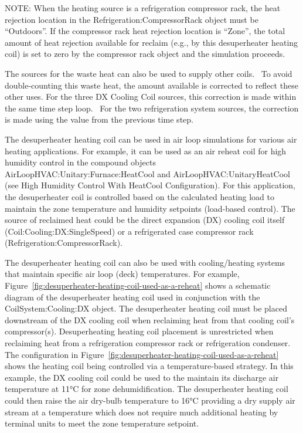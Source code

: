 NOTE: When the heating source is a refrigeration compressor rack, the heat rejection location in the Refrigeration:CompressorRack object must be ``Outdoors''. If the compressor rack heat rejection location is ``Zone'', the total amount of heat rejection available for reclaim (e.g., by this desuperheater heating coil) is set to zero by the compressor rack object and the simulation proceeds.

The sources for the waste heat can also be used to supply other coils.~ To avoid double-counting this waste heat, the amount available is corrected to reflect these other uses. For the three DX Cooling Coil sources, this correction is made within the same time step loop.~ For the two refrigeration system sources, the correction is made using the value from the previous time step.

The desuperheater heating coil can be used in air loop simulations for various air heating applications. For example, it can be used as an air reheat coil for high humidity control in the compound objects AirLoopHVAC:Unitary:Furnace:HeatCool and AirLoopHVAC:UnitaryHeatCool (see High Humidity Control With HeatCool Configuration). For this application, the desuperheater coil is controlled based on the calculated heating load to maintain the zone temperature and humidity setpoints (load-based control). The source of reclaimed heat could be the direct expansion (DX) cooling coil itself (Coil:Cooling:DX:SingleSpeed) or a refrigerated case compressor rack (Refrigeration:CompressorRack).

The desuperheater heating coil can also be used with cooling/heating systems that maintain specific air loop (deck) temperatures. For example, Figure~\ref{fig:desuperheater-heating-coil-used-as-a-reheat} shows a schematic diagram of the desuperheater heating coil used in conjunction with the CoilSystem:Cooling:DX object. The desuperheater heating coil must be placed downstream of the DX cooling coil when reclaiming heat from that cooling coil's compressor(s). Desuperheating heating coil placement is unrestricted when reclaiming heat from a refrigeration compressor rack or refrigeration condenser. The configuration in Figure~\ref{fig:desuperheater-heating-coil-used-as-a-reheat} shows the heating coil being controlled via a temperature-based strategy. In this example, the DX cooling coil could be used to the maintain its discharge air temperature at 11°C for zone dehumidification. The desuperheater heating coil could then raise the air dry-bulb temperature to 16°C providing a dry supply air stream at a temperature which does not require much additional heating by terminal units to meet the zone temperature setpoint.

